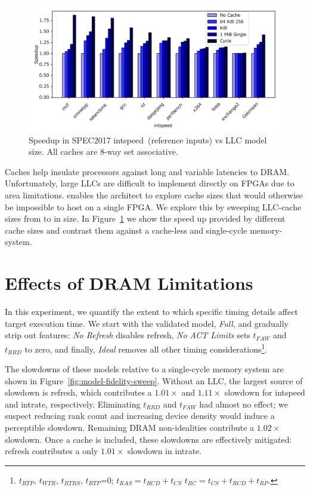 \begin{figure}[t]
    \centering
    \includegraphics[width=\columnwidth]{figures/cache_size_bar_plot.pdf}
    \vspace{-0.35in}
    \caption{Speedup in SPEC2017 intspeed~(reference inputs) vs LLC model size. All caches are 8-way set associative.}
    \label{fig:llc-speedup}
    \vspace{-0.15in}
\end{figure}

Caches help insulate processors against long and variable latencies to DRAM.
Unfortunately, large LLCs are difficult to implement directly on FPGAs due to
area limitations. \PNAME enables the architect to explore cache sizes that
would otherwise be impossible to host on a single FPGA. We explore this by
sweeping LLC-cache sizes from  to  in size. In
Figure~\ref{fig:llc-speedup} we show the speed up provided by different cache
sizes and contrast them against a cache-less and single-cycle memory-system.

\section{Effects of DRAM Limitations}

In this experiment, we quantify the extent to which specific timing details
affect target execution time. We start with the validated model, \emph{Full}, and
gradually strip out features: \emph{No Refresh} disables refresh, \emph{No ACT
Limits} sets $t_{FAW}$ and $t_{RRD}$ to zero, and finally, \emph{Ideal} removes
all other timing considerations\footnote{$t_{RTP}$, $t_{WTR}$,
$t_{RTRS}$, $t_{RTP}$=0; $t_{RAS} = t_{RCD} + t_{CS}$ $t_{RC} =
t_{CS} + t_{RCD} + t_{RP}$.}.

The slowdowns of these models relative to a single-cycle memory system are
shown in Figure~\ref{fig:model-fidelity-sweep}. Without an LLC, the largest
source of slowdown is refresh, which contributes a $1.01\times$ and
$1.11\times$ slowdown for intspeed and intrate, respectively.  Eliminating $t_{RRD}$ and $t_{FAW}$ had almost no effect; we
suspect reducing rank count and increasing device density would induce a perceptible slowdown.
Remaining DRAM non-idealities contribute a $1.02\times$ slowdown.  Once
a cache is included, these slowdowns are effectively mitigated: refresh
contributes a only $1.01\times$ slowdown in intrate.

